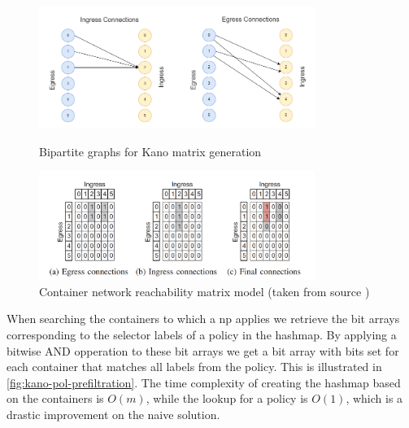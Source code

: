 \begin{figure}
\centering
    \begin{minipage}[b]{0.8\linewidth}
        \centering
        \includegraphics[width=0.8\textwidth]{images/kano-combined-connections-graph.png} 
        \caption{Bipartite graphs for Kano matrix generation} 
        \label{fig:kano-bipartite-graphs}
    \end{minipage}
    \begin{minipage}[b]{0.8\linewidth}
         \centering
          \includegraphics[width=0.8\textwidth]{images/kano-matrix-generation.png} 
          \caption{Container network reachability matrix model (taken from source \cite{kano})} 
          \label{fig:kano-reach-matrix}
    \end{minipage}
      
\end{figure}

When searching the containers to which a \acrshort{np} applies we retrieve the bit arrays corresponding to the selector labels of a policy in the hashmap. By applying a bitwise AND opperation to these bit arrays we get a bit array with bits set for each container that matches all labels from the policy. This is illustrated in \autoref{fig:kano-pol-prefiltration}. The time complexity of creating the hashmap based on the containers is $O(m)$, while the lookup for a policy is $O(1)$, which is a drastic improvement on the naive solution.
\\[10pt]

